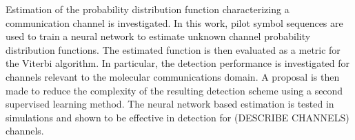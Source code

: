 Estimation of the probability distribution function characterizing a communication channel is investigated. In this work, pilot symbol sequences are used to train a neural network to estimate unknown channel probability distribution functions. The estimated function is then evaluated as a metric for the Viterbi algorithm. In particular, the detection performance is investigated for channels relevant to the molecular communications domain. A proposal is then made to reduce the complexity of the resulting detection scheme using a second supervised learning method. The neural network based estimation is tested in simulations and shown to be effective in detection for (DESCRIBE CHANNELS) channels. 